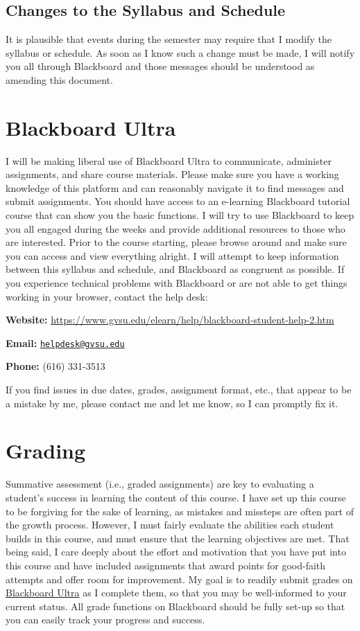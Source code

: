\documentclass[
  12pt,
  letterpaper,
]{scrartcl}
\begin{document}
\subsection{Changes to the Syllabus and
Schedule}\label{changes-to-the-syllabus-and-schedule}

It is plausible that events during the semester may require that I
modify the syllabus or schedule. As soon as I know such a change must be
made, I will notify you all through Blackboard and those messages should
be understood as amending this document.

\section{Blackboard Ultra}\label{blackboard-ultra}

I will be making liberal use of Blackboard Ultra to communicate,
administer assignments, and share course materials. Please make sure you
have a working knowledge of this platform and can reasonably navigate it
to find messages and submit assignments. You should have access to an
e-learning Blackboard tutorial course that can show you the basic
functions. I will try to use Blackboard to keep you all engaged during
the weeks and provide additional resources to those who are interested.
Prior to the course starting, please browse around and make sure you can
access and view everything alright. I will attempt to keep information
between this syllabus and schedule, and Blackboard as congruent as
possible. If you experience technical problems with Blackboard or are
not able to get things working in your browser, contact the help desk:

\textbf{Website:}
\url{https://www.gvsu.edu/elearn/help/blackboard-student-help-2.htm}

\textbf{Email:}
\href{mailto:helpdesk@gvsu.edu}{\nolinkurl{helpdesk@gvsu.edu}}

\textbf{Phone:} (616) 331-3513

If you find issues in due dates, grades, assignment format, etc., that
appear to be a mistake by me, please contact me and let me know, so I
can promptly fix it.

\section{Grading}\label{grading}

Summative assessment (i.e., graded assignments) are key to evaluating a
student's success in learning the content of this course. I have set up
this course to be forgiving for the sake of learning, as mistakes and
missteps are often part of the growth process. However, I must fairly
evaluate the abilities each student builds in this course, and must
ensure that the learning objectives are met. That being said, I care
deeply about the effort and motivation that you have put into this
course and have included assignments that award points for good-faith
attempts and offer room for improvement. My goal is to readily submit
grades on \hyperref[blackboard-ultra]{Blackboard Ultra} as I complete
them, so that you may be well-informed to your current status. All grade
functions on Blackboard should be fully set-up so that you can easily
track your progress and success.
\end{document}
